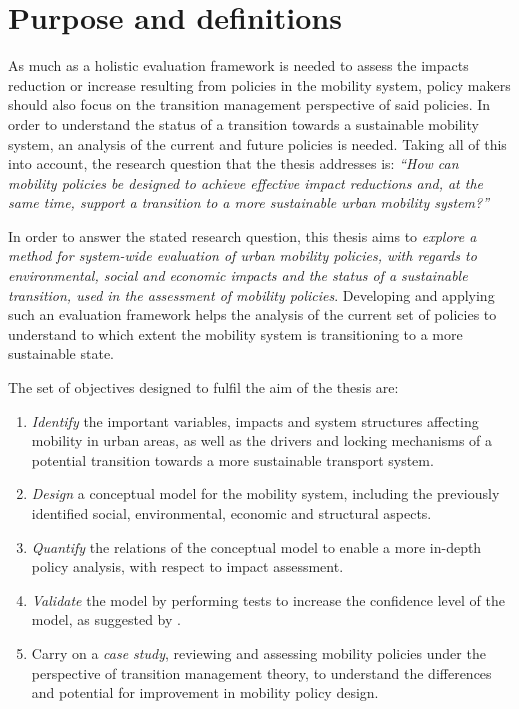 \documentclass[a4paper,fontsize=11pt,bibliography=totoc]{scrartcl}
\begin{document}
\section{Purpose and definitions}
As much as a holistic evaluation framework is needed to assess the impacts reduction or increase resulting from policies in the mobility system, policy makers should also focus on the transition management perspective of said policies. In order to understand the status of a transition towards a sustainable mobility system, an analysis of the current and future policies is needed. Taking all of this into account, the research question that the thesis addresses is: \textit{``How can mobility policies be designed to achieve effective impact reductions and, at the same time, support a transition to a more sustainable urban mobility system?''}

In order to answer the stated research question, this thesis aims to \textit{explore a method for system-wide evaluation of urban mobility policies, with regards to environmental, social and economic impacts and the status of a sustainable transition, used in the assessment of mobility policies}. Developing and applying such an evaluation framework helps the analysis of the current set of policies to understand to which extent the mobility system is transitioning to a more sustainable state.

The set of objectives designed to fulfil the aim of the thesis are:
\begin{enumerate}[label=(\alph*)]
	\item \textit{Identify} the important variables, impacts and system structures affecting mobility in urban areas, as well as the drivers and locking mechanisms of a potential transition towards a more sustainable transport system.
	\item \textit{Design} a conceptual model for the mobility system, including the previously identified social, environmental, economic and structural aspects.
	\item \textit{Quantify} the relations of the conceptual model to enable a more in-depth policy analysis, with respect to impact assessment.
	\item \textit{Validate} the model by performing tests to increase the confidence level of the model, as suggested by \textcite{forrester1978_TestsBuildingConfidence,qudrat-ullah2010_Howdostructural}.
	\item Carry on a \textit{case study}, reviewing and assessing mobility policies under the perspective of transition management theory, to understand the differences and potential for improvement in mobility policy design.
\end{enumerate}
\end{document}
